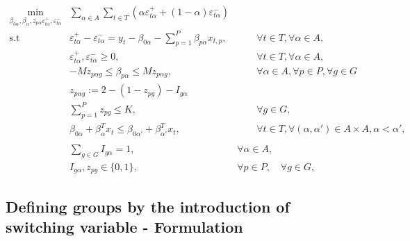 \begin{eqnarray}
 \underset{\beta_{0\alpha},\beta_\alpha,z_{p \alpha} \varepsilon_{t \alpha}^{+},\varepsilon_{t \alpha}^{-}}{\text{min}} & \sum_{\alpha \in A} \sum_{t\in T}\left(\alpha\varepsilon_{t \alpha}^{+}+(1-\alpha)\varepsilon_{t\alpha}^{-}\right) \label{eq:mip0} \\
\mbox{s.t } & \varepsilon_{t \alpha}^{+}-\varepsilon_{t \alpha}^{-}=y_{t}-\beta_{0 \alpha}-\sum_{p=1}^{P}\beta_{p \alpha}x_{t,p},& \qquad\forall t \in T ,\forall \alpha \in A, \label{eq:mip1}\\
& \varepsilon_{t \alpha}^{+},\varepsilon_{t \alpha}^{-}\geq0,&\qquad\forall t \in T ,\forall \alpha \in A, \label{eq:mip2}\\
& - M z_{p \alpha g} \leq \beta_{p \alpha} \leq M z_{p \alpha g},&\qquad \forall \alpha \in A, \forall p\in P, \forall g \in G \label{eq:mip3}\\
&z_{p \alpha g} := 2 - ( 1-z_{pg}) - I_{g\alpha}& \label{mipgrupzpa} \\
& \sum_{p=1}^P z_{p g} \leq K, & \qquad \forall g \in G, \label{eq:mip4}\\
& \beta_{0\alpha} + \beta_{\alpha}^T x_{t} \leq \beta_{0\alpha'} + \beta_{\alpha'}^T x_{t}, & \qquad \forall t \in T, \forall (\alpha, \alpha') \in A \times A,  \alpha < \alpha',\nonumber\\ \label{eq:mip6} \\
& \sum\limits_{g \in G} I_{g\alpha} = 1, & \forall \alpha \in A,\label{eq:mipgrupa} \\
& I_{g\alpha}, z_{pg} \in \{0,1\},& \forall p \in P, \quad \forall g \in G, 
\end{eqnarray}

\subsection{Defining groups by the introduction of switching variable -
Formulation}\label{defining-groups-by-the-introduction-of-switching-variable---formulation}

\tiny

